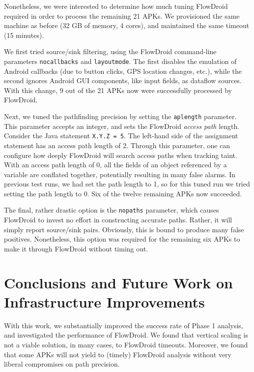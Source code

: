 Nonetheless, we were interested to determine how much tuning FlowDroid required in order to process the remaining 21 APKs.  We provisioned the same machine as before (32 GB of memory, 4 cores), and maintained the same timeout (15 minutes).  

We first tried source/sink filtering, using the FlowDroid command-line parameters \texttt{nocallbacks} and \texttt{layoutmode}.  The first disables the emulation of Android callbacks (due to button clicks, GPS location changes, etc.), while the second ignores Android GUI components, like input fields, as dataflow sources.  With this change, 9 out of the 21 APKs now were successfully processed by FlowDroid. 

Next, we tuned the pathfinding precision by setting the \texttt{aplength} parameter.  This parameter accepts an integer, and sets the FlowDroid \emph{access path} length.  Consider the Java statement \texttt{X.Y.Z = 5}.  The left-hand side of the assignment statement has an access path length of 2.  Through this parameter, one can configure how deeply FlowDroid will search access paths when tracking taint.  With an access path length of 0, all the fields of an object referenced by a variable are conflated together, potentially resulting in many false alarms.  In previous test runs, we had set the path length to 1, so for this tuned run we tried setting the path length to 0.  Six of the twelve remaining APKs now succeeded. 

The final, rather drastic option is the \texttt{nopaths} parameter, which causes FlowDroid to invest no effort in constructing accurate paths.  Rather, it will simply report source/sink pairs.  Obviously, this is bound to produce many false positives.  Nonetheless, this option was required for the remaining six APKs to make it through FlowDroid without timing out.
\section{Conclusions and Future Work on Infrastructure Improvements}
With this work, we substantially improved the success rate of Phase 1 analysis, and investigated the performance of FlowDroid.  We found that vertical scaling is not a viable solution, in many cases, to FlowDroid timeouts.  Moreover, we found that some APKs will not yield to (timely) FlowDroid analysis without very liberal compromises on path precision.

